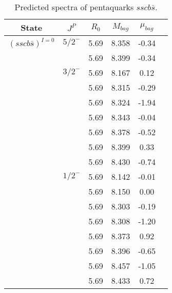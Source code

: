 \documentclass[prd,twocolumn,floatfix,nofootinbib]{revtex4}
\begin{document}
\begin{table*}[!htbp]
    \caption{Predicted spectra of pentaquarks $sscb\bar{s }$.}
    \begin{tabular}{cccccc}
        \hline\hline
        {\rm State} &$J^{P}$ &$R_{0}$ &$M_{bag}$ &$\mu_{bag}$  \\ \hline
        ${(sscb\bar{s})}^{I=0}$
            &${5/2}^{-}$     &5.69   &8.358 &-0.34 \\ 
                         &$ $     &5.69   &8.399 &-0.34 \\                         
            &${3/2}^{-}$     &5.69   &8.167 &0.12 \\
                         &$ $     &5.69   &8.315 &-0.29  \\
                         &$ $     &5.69   &8.324 &-1.94  \\
                         &$ $     &5.69   &8.343 &-0.04 \\
                         &$ $     &5.69   &8.378 &-0.52  \\
                         &$ $     &5.69   &8.399 &0.33  \\
                         &$ $     &5.69   &8.430 &-0.74 \\                        
            &${1/2}^{-}$     &5.69   &8.142 &-0.01  \\
                         &$ $     &5.69   &8.150 &0.00  \\
                         &$ $     &5.69   &8.303 &-0.19 \\
                         &$ $     &5.69   &8.308 &-1.20 \\
                         &$ $     &5.69   &8.373 &0.92  \\
                         &$ $     &5.69   &8.396 &-0.65 \\
                         &$ $     &5.69   &8.457 &-1.05 \\                         
                         &$ $     &5.69   &8.433 &0.72 \\                          
       \hline\hline
    \end{tabular}
\end{table*}
\end{document}
